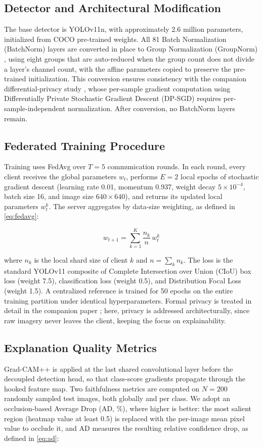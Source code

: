 \documentclass[conference, compsoc, twoside]{IEEEtran}
\begin{document}
\subsection{Detector and Architectural Modification}
The base detector is YOLOv11n, with approximately 2.6 million parameters, initialized from COCO \cite{coco} pre-trained weights. All 81 Batch Normalization (BatchNorm) layers are converted in place to Group Normalization (GroupNorm) \cite{groupnorm}, using eight groups that are auto-reduced when the group count does not divide a layer's channel count, with the affine parameters copied to preserve the pre-trained initialization. This conversion ensures consistency with the companion differential-privacy study \cite{paperA}, whose per-sample gradient computation using Differentially Private Stochastic Gradient Descent (DP-SGD) \cite{abadi2016} requires per-sample-independent normalization. After conversion, no BatchNorm layers remain.

\subsection{Federated Training Procedure}
Training uses FedAvg over $T = 5$ communication rounds. In each round, every client receives the global parameters $w_t$, performs $E = 2$ local epochs of stochastic gradient descent (learning rate 0.01, momentum 0.937, weight decay $5 \times 10^{-4}$, batch size 16, and image size $640 \times 640$), and returns its updated local parameters $w_t^{k}$. The server aggregates by data-size weighting, as defined in \eqref{eq:fedavg}:

\begin{equation}
w_{t+1} = \sum_{k=1}^{K} \frac{n_k}{n}\, w_{t}^{k}
\label{eq:fedavg}
\end{equation}

where $n_k$ is the local shard size of client $k$ and $n = \sum_k n_k$. The loss is the standard YOLOv11 composite of Complete Intersection over Union (CIoU) box loss (weight 7.5), classification loss (weight 0.5), and Distribution Focal Loss (weight 1.5). A centralized reference is trained for 50 epochs on the entire training partition under identical hyperparameters. Formal privacy is treated in detail in the companion paper \cite{paperA}; here, privacy is addressed architecturally, since raw imagery never leaves the client, keeping the focus on explainability.

\subsection{Explanation Quality Metrics}
Grad-CAM++ is applied at the last shared convolutional layer before the decoupled detection head, so that class-score gradients propagate through the hooked feature map. Two faithfulness metrics are computed on $N = 200$ randomly sampled test images, both globally and per class. We adopt an occlusion-based Average Drop (AD, \%), where higher is better: the most salient region (heatmap value at least 0.5) is replaced with the per-image mean pixel value to occlude it, and AD measures the resulting relative confidence drop, as defined in \eqref{eq:ad}:
\end{document}
